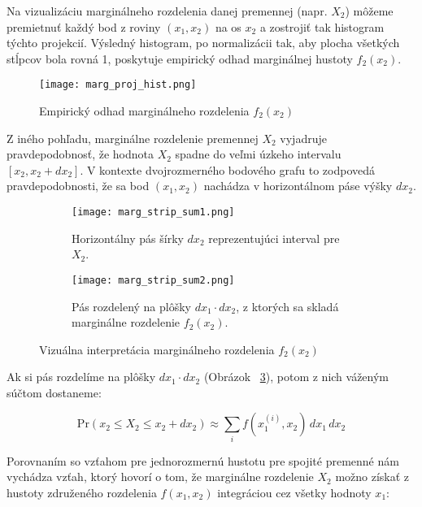 Na vizualizáciu marginálneho rozdelenia danej premennej (napr. $X_2$) môžeme premietnuť každý bod z roviny $(x_1, x_2)$ na os $x_2$ a zostrojiť tak histogram týchto projekcií. Výsledný histogram, po normalizácii tak, aby plocha všetkých stĺpcov bola rovná 1, poskytuje empirický odhad marginálnej hustoty $f_2(x_2)$.

\begin{figure}[H] 
    \centering 
    \texttt{[image: marg\_proj\_hist.png]} 
    \caption{Empirický odhad marginálneho rozdelenia $f_2(x_2)$} 
    \label{fig:margin_proj} 
\end{figure}

Z iného pohľadu, marginálne rozdelenie premennej $X_2$ vyjadruje pravdepodobnosť, že hodnota $X_2$ spadne do veľmi úzkeho intervalu $[x_2, x_2 + dx_2]$. V kontexte dvojrozmerného bodového grafu to zodpovedá pravdepodobnosti, že sa bod $(x_1, x_2)$ nachádza v horizontálnom páse výšky $dx_2$.

\begin{figure}[H]
    \centering
    \begin{subfigure}[b]{0.48\linewidth}
        \centering
        \texttt{[image: marg\_strip\_sum1.png]}
        \caption{Horizontálny pás šírky $dx_2$ reprezentujúci interval pre $X_2$.}
        \label{fig:marg_strip_a}
    \end{subfigure}
    \hfill
    \begin{subfigure}[b]{0.48\linewidth}
        \centering
        \texttt{[image: marg\_strip\_sum2.png]}
        \caption{Pás rozdelený na plôšky $dx_1 \cdot dx_2$, z ktorých sa skladá marginálne rozdelenie $f_2(x_2)$.}
        \label{fig:marg_strip_b}
    \end{subfigure}
    \caption{Vizuálna interpretácia marginálneho rozdelenia $f_2(x_2)$}
    \label{fig:marg_strip}
\end{figure}

Ak si pás rozdelíme na plôšky $dx_1 \cdot dx_2$  (Obrázok ~\ref{fig:marg_strip_b}), potom z nich váženým súčtom dostaneme:

\begin{equation}
\mathrm{Pr}(x_2 \leq X_2 \leq x_2 + dx_2) \approx \sum_i f(x_1^{(i)}, x_2) \, dx_1 \, dx_2
\end{equation}

Porovnaním so vzťahom pre jednorozmernú hustotu pre spojité premenné nám vychádza vzťah, ktorý hovorí o tom, že marginálne rozdelenie $X_2$ možno získať z hustoty združeného rozdelenia $f(x_1, x_2)$ integráciou cez všetky hodnoty $x_1$:

